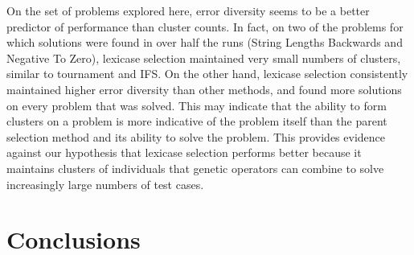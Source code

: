 On the set of problems explored here, error diversity seems to be a better predictor of performance than cluster counts. In fact, on two of the problems for which  solutions were found in over half the runs (String Lengths Backwards and Negative To Zero), lexicase selection maintained very small numbers of clusters, similar to tournament and IFS. 
On the other hand, lexicase selection consistently maintained higher error diversity than other methods, and found more solutions on every problem that was solved. This may indicate that the ability to form clusters on a problem is more indicative of the problem itself than the parent selection method and its ability to solve the problem. This provides evidence against our hypothesis that lexicase selection performs better because it maintains clusters of individuals that genetic operators can combine to solve increasingly large numbers of test cases.


\section{Conclusions}

